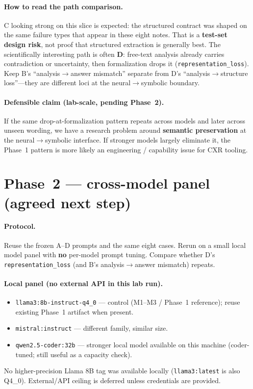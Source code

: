 \documentclass[11pt,a4paper]{article}
\begin{document}
\paragraph{How to read the path comparison.}
C looking strong on this slice is expected: the structured contract was shaped on the same failure types that appear in these eight notes.
That is a \textbf{test-set design risk}, not proof that structured extraction is generally best.
The scientifically interesting path is often \textbf{D}: free-text analysis already carries contradiction or uncertainty, then formalization drops it (\texttt{representation\_loss}).
Keep B's ``analysis$\rightarrow$answer mismatch'' separate from D's ``analysis$\rightarrow$structure loss''---they are different loci at the neural$\rightarrow$symbolic boundary.

\paragraph{Defensible claim (lab-scale, pending Phase~2).}
If the same drop-at-formalization pattern repeats across models and later across unseen wording, we have a research problem around \textbf{semantic preservation} at the neural$\rightarrow$symbolic interface.
If stronger models largely eliminate it, the Phase~1 pattern is more likely an engineering / capability issue for CXR tooling.

\section{Phase~2 --- cross-model panel (agreed next step)}

\paragraph{Protocol.}
Reuse the frozen A--D prompts and the same eight cases.
Rerun on a small local model panel with \textbf{no} per-model prompt tuning.
Compare whether D's \texttt{representation\_loss} (and B's analysis$\rightarrow$answer mismatch) repeats.

\paragraph{Local panel (no external API in this lab run).}
\begin{itemize}
  \item \texttt{llama3:8b-instruct-q4\_0} --- control (M1--M3 / Phase~1 reference); reuse existing Phase~1 artifact when present.
  \item \texttt{mistral:instruct} --- different family, similar size.
  \item \texttt{qwen2.5-coder:32b} --- stronger local model available on this machine (coder-tuned; still useful as a capacity check).
\end{itemize}
No higher-precision Llama 8B tag was available locally (\texttt{llama3:latest} is also Q4\_0).
External/API ceiling is deferred unless credentials are provided.
\end{document}
